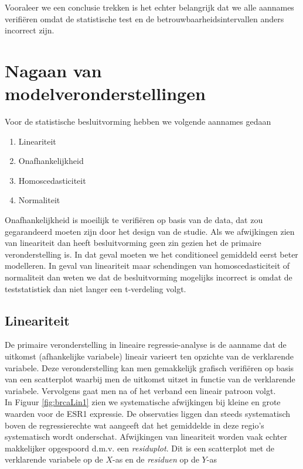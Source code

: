 \documentclass[
  12pt,dutch,coursenotes]{book}
\providecommand{\tightlist}{%
  \setlength{\itemsep}{0pt}\setlength{\parskip}{0pt}}
\theoremstyle{definition}
\theoremstyle{definition}
\theoremstyle{definition}
\theoremstyle{remark}
\begin{document}
Vooraleer we een conclusie trekken is het echter belangrijk dat we alle aannames verifiëren omdat de statistische test en de betrouwbaarheidsintervallen anders incorrect zijn.

\hypertarget{nagaan-van-modelveronderstellingen}{%
\section{Nagaan van modelveronderstellingen}\label{nagaan-van-modelveronderstellingen}}

Voor de statistische besluitvorming hebben we volgende aannames gedaan

\begin{enumerate}
\def\labelenumi{\arabic{enumi}.}
\tightlist
\item
  Lineariteit
\item
  Onafhankelijkheid\\
\item
  Homoscedasticiteit
\item
  Normaliteit
\end{enumerate}

Onafhankelijkheid is moeilijk te verifiëren op basis van de data, dat zou gegarandeerd moeten zijn door het design van de studie.
Als we afwijkingen zien van lineariteit dan heeft besluitvorming geen zin gezien het de primaire veronderstelling is.
In dat geval moeten we het conditioneel gemiddeld eerst beter modelleren.
In geval van lineariteit maar schendingen van homoscedasticiteit of normaliteit dan weten we dat de besluitvorming mogelijks incorrect is omdat de teststatistiek dan niet langer een t-verdeling volgt.

\hypertarget{lineariteit}{%
\subsection{Lineariteit}\label{lineariteit}}

De primaire veronderstelling in lineaire regressie-analyse is de aanname dat de uitkomst (afhankelijke variabele) lineair varieert ten opzichte van de verklarende variabele. Deze veronderstelling kan men gemakkelijk grafisch verifiëren op basis van een scatterplot waarbij men de uitkomst uitzet in functie van de verklarende variabele. Vervolgens gaat men na of het verband een lineair patroon volgt.\\
In Figuur \ref{fig:brcaLin1} zien we systematische afwijkingen bij kleine en grote waarden voor de ESR1 expressie.
De observaties liggen dan steeds systematisch boven de regressierechte wat aangeeft dat het gemiddelde in deze regio's systematisch wordt onderschat.
Afwijkingen van lineariteit worden vaak echter makkelijker opgespoord d.m.v. een \emph{residuplot}. Dit is een scatterplot met de
verklarende variabele op de \(X\)-as en de \emph{residuen} op de \(Y\)-as
\end{document}
